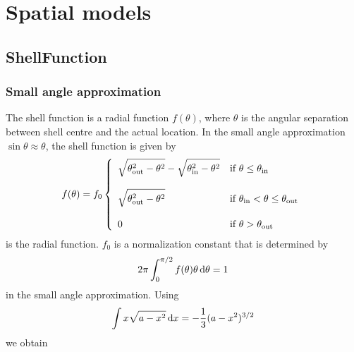 \documentclass{article}[12pt,a4]
\begin{document}
\section{Spatial models}

\subsection{ShellFunction}

\subsubsection{Small angle approximation}

The shell function is a radial function $f(\theta)$, where $\theta$ is the angular separation
between shell centre and the actual location.
In the small angle approximation $\sin \theta \approx \theta$, the shell function is given
by
\begin{equation}
f(\theta) = f_0 \left \{
   \begin{array}{l l}
      \displaystyle
      \sqrt{ \theta_{\rm out}^2 - \theta^2 } - \sqrt{ \theta_{\rm in}^2 - \theta^2 }
      & \mbox{if $\theta \le \theta_{\rm in}$} \\
      \\
     \displaystyle
      \sqrt{ \theta_{\rm out}^2 - \theta^2 }
      & \mbox{if $\theta_{\rm in} < \theta \le \theta_{\rm out}$} \\
      \\
     \displaystyle
     0 & \mbox{if $\theta > \theta_{\rm out}$}
   \end{array}
   \right .
\end{equation}
is the radial function.
$f_0$ is a normalization constant that is determined by
\begin{equation}
2 \pi \int_0^{\pi/2} f(\theta) \theta \, {\rm d}\theta = 1
\end{equation}
in the small angle approximation.
Using
\begin{equation}
\int x \sqrt {a-x^2} \, {\rm d}x = -\frac{1}{3} (a-x^2)^{3/2}
\end{equation}
we obtain
\end{document}
